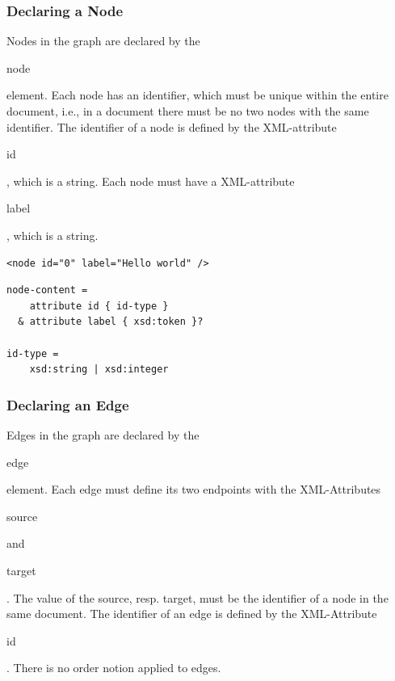 \documentclass[a4paper,10pt]{article}
\begin{document}
\subsubsection{Declaring a Node}

Nodes in the graph are declared by the \begin{footnotesize}node\end{footnotesize} element. Each node has an identifier, which must be unique within the entire document, i.e., in a document there must be no two nodes with the same identifier. The identifier of a node is defined by the XML-attribute \begin{footnotesize}id\end{footnotesize}, which is a string. Each node must have a XML-attribute \begin{footnotesize}label\end{footnotesize}, which is a string.

\lstset{ style=gexf }
\begin{lstlisting}[caption={A node!},label=aNode]
<node id="0" label="Hello world" />
\end{lstlisting}

\lstset{ style=rnc }
\begin{lstlisting}[caption={Node Specification},label=nodeRNC]
node-content =
    attribute id { id-type }
  & attribute label { xsd:token }?

id-type =
    xsd:string | xsd:integer
\end{lstlisting}

\subsubsection{Declaring an Edge}

Edges in the graph are declared by the \begin{footnotesize}edge\end{footnotesize} element. Each edge must define its two endpoints with the XML-Attributes \begin{footnotesize}source\end{footnotesize} and \begin{footnotesize}target\end{footnotesize}. The value of the source, resp. target, must be the identifier of a node in the same document. The identifier of an edge is defined by the XML-Attribute \begin{footnotesize}id\end{footnotesize}. There is no order notion applied to edges.
\end{document}
